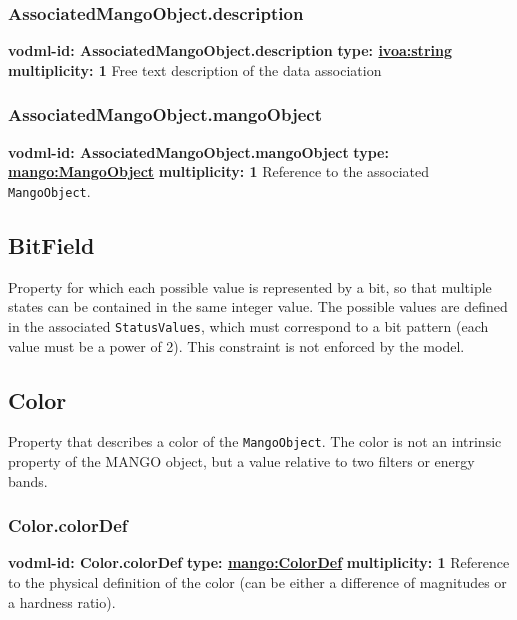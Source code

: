     \subsubsection{AssociatedMangoObject.description}
      \textbf{vodml-id: AssociatedMangoObject.description} \newline
      \textbf{type: \hyperref[sect:ivoa]{ivoa:string}} \newline
      \textbf{multiplicity: 1} \newline
      Free text description of the data association

    \subsubsection{AssociatedMangoObject.mangoObject}
      \textbf{vodml-id: AssociatedMangoObject.mangoObject} \newline
      \textbf{type: \hyperref[sect:MangoObject]{mango:MangoObject}} \newline
      \textbf{multiplicity: 1} \newline
      Reference to the associated \texttt{MangoObject}.

  \subsection{BitField}
  \label{sect:BitField}
    Property for which each possible value is represented by a bit, so that multiple states can be contained in the same integer value. The possible values are defined in the associated \texttt{StatusValues}, which must correspond to a bit pattern (each value must be a power of 2). This constraint is not enforced by the model.

  \subsection{Color}
  \label{sect:Color}
    Property that describes a color of the \texttt{MangoObject}. The color is not an intrinsic property of the MANGO object, but a value relative to two filters or energy bands.

    \subsubsection{Color.colorDef}
      \textbf{vodml-id: Color.colorDef} \newline
      \textbf{type: \hyperref[sect:ColorDef]{mango:ColorDef}} \newline
      \textbf{multiplicity: 1} \newline
      Reference to the physical definition of the color (can be either a difference of magnitudes or a hardness ratio).

